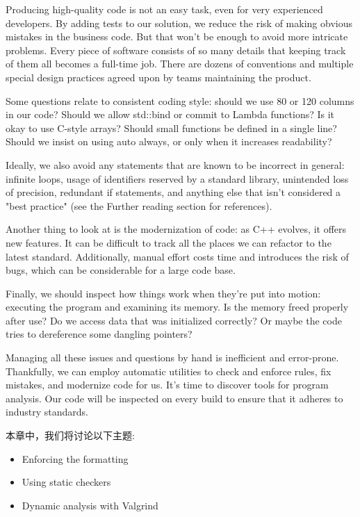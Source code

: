 Producing high-quality code is not an easy task, even for very experienced developers. By adding tests to our solution, we reduce the risk of making obvious mistakes in the business code. But that won't be enough to avoid more intricate problems. Every piece of software consists of so many details that keeping track of them all becomes a full-time job. There are dozens of conventions and multiple special design practices agreed upon by teams maintaining the product.

Some questions relate to consistent coding style: should we use 80 or 120 columns in our code? Should we allow std::bind or commit to Lambda functions? Is it okay to use C-style arrays? Should small functions be defined in a single line? Should we insist on using auto always, or only when it increases readability?

Ideally, we also avoid any statements that are known to be incorrect in general: infinite loops, usage of identifiers reserved by a standard library, unintended loss of precision, redundant if statements, and anything else that isn't considered a "best practice" (see the Further reading section for references).

Another thing to look at is the modernization of code: as C++ evolves, it offers new features. It can be difficult to track all the places we can refactor to the latest standard. Additionally, manual effort costs time and introduces the risk of bugs, which can be considerable for a large code base.

Finally, we should inspect how things work when they're put into motion: executing the program and examining its memory. Is the memory freed properly after use? Do we access data that was initialized correctly? Or maybe the code tries to dereference some dangling pointers?

Managing all these issues and questions by hand is inefficient and error-prone. Thankfully, we can employ automatic utilities to check and enforce rules, fix mistakes, and modernize code for us. It's time to discover tools for program analysis. Our code will be inspected on every build to ensure that it adheres to industry standards.

本章中，我们将讨论以下主题:

\begin{itemize}
\item 
Enforcing the formatting

\item 
Using static checkers

\item 
Dynamic analysis with Valgrind
\end{itemize}













